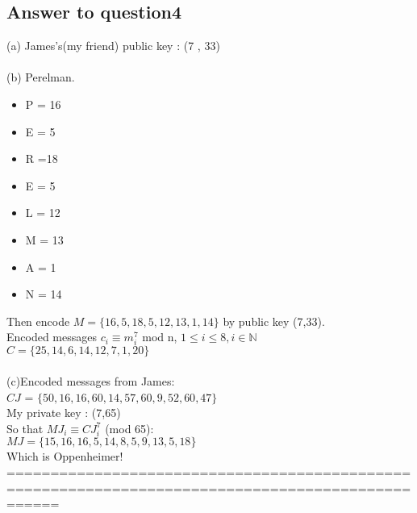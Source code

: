 \documentclass[12pt,a4paper]{article}
\begin{document}
\subsection*{Answer to question4}
(a) James's(my friend) public key : (7 ,  33)\\\\
(b) Perelman.
\begin{itemize}
\item P = 16
\item E = 5
\item R =18
\item E = 5
\item L = 12
\item M = 13
\item A = 1
\item N = 14
\end{itemize}
Then encode $M = \{16,5,18,5,12,13,1,14\}$ by public key (7,33).\\
Encoded messages $c_i \equiv m_i^7$ mod n,  $1 \leq i \leq 8,i \in \mathbb{N}$\\
$C = \{25,14,6,14,12,7,1,20\}$\\\\
(c)Encoded messages from James:\\
$CJ$ = $\{50, 16, 16, 60, 14, 57, 60, 9, 52, 60, 47\}$\\
My private key : (7,65)\\
So that $MJ_i \equiv CJ_i^7$ (mod 65):\\
$MJ = \{15, 16, 16, 5, 14, 8, 5, 9, 13, 5, 18\}$\\
Which is Oppenheimer!\\
==================================================================================================
\end{document}
